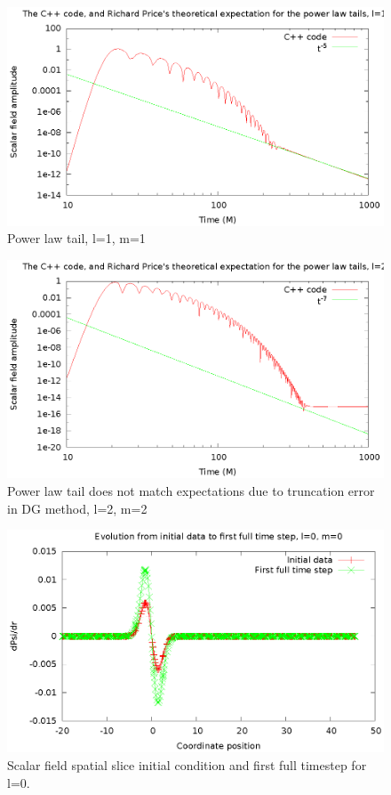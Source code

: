\begin{figure}
  \includegraphics{l1m1tail2}
  \caption{Power law tail, l=1, m=1}
\end{figure}

\begin{figure}
  \includegraphics{l2m2tailfail2}
  \caption{Power law tail does not match expectations due to truncation error in DG method, l=2, m=2}
\end{figure}

\begin{figure}
  \includegraphics{phi1dl0}
  \caption{Scalar field spatial slice initial condition and first full timestep for l=0.}
\end{figure}

